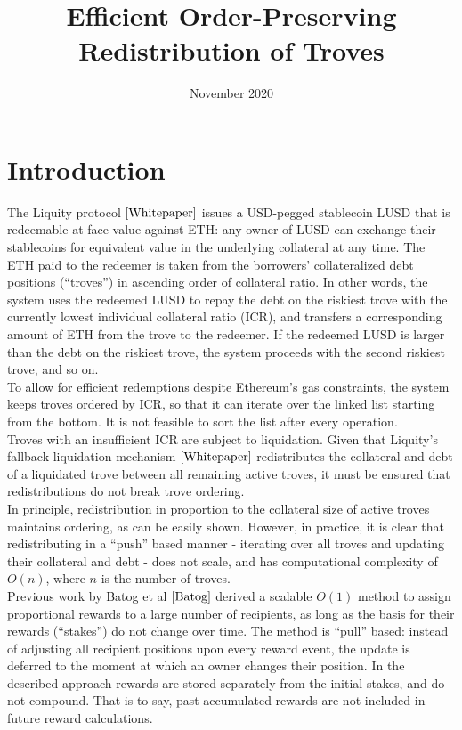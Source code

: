 \documentclass[reqno]{article}
\begin{document}
\title{\textbf{Efficient Order-Preserving Redistribution of Troves}}
\date{November 2020}
\maketitle

\tableofcontents

\section{Introduction}


The Liquity protocol $\cite{Whitepaper}$ issues a USD-pegged stablecoin LUSD that is redeemable at face value against ETH: any owner of LUSD can exchange their stablecoins for equivalent value in the underlying collateral at any time. The ETH paid to the redeemer is taken from the borrowers' collateralized debt positions (“troves”) in ascending order of collateral ratio. In other words, the system uses the redeemed LUSD to repay the debt on the riskiest trove with the currently lowest individual collateral ratio (ICR), and transfers a corresponding amount of ETH from the trove to the redeemer. If the redeemed LUSD is larger than the debt on the riskiest trove, the system proceeds with the second riskiest trove, and so on. \\

To allow for efficient redemptions despite Ethereum's gas constraints, the system keeps troves ordered by ICR, so that it can iterate over the linked list starting from the bottom. It is not feasible to sort the list after every operation. \\

Troves with an insufficient ICR are subject to liquidation. Given that Liquity's fallback liquidation mechanism $\cite{Whitepaper}$ redistributes the collateral and debt of a liquidated trove between all remaining active troves, it must be ensured that redistributions do not break trove ordering. \\

In principle, redistribution in proportion to the collateral size of active troves maintains ordering, as can be easily shown. However, in practice, it is clear that redistributing in a “push” based manner - iterating over all troves and updating their collateral and debt - does not scale, and has computational complexity of $O(n)$, where $n$ is the number of troves. \\

Previous work by Batog et al $\cite{Batog}$ derived a scalable $O(1)$ method to assign proportional rewards to a large number of recipients, as long as the basis for their rewards (“stakes”) do not change over time. The method is “pull” based: instead of adjusting all recipient positions upon every reward event, the update is deferred to the moment at which an owner changes their position. In the described approach rewards are stored separately from the initial stakes, and do not compound. That is to say, past accumulated rewards are not included in future reward calculations. \\
\end{document}
